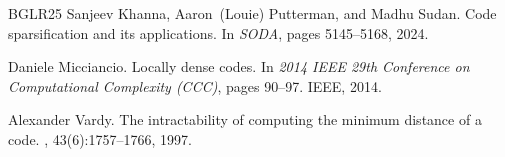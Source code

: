 \documentclass{article}
\begin{document}
\begin{thebibliography}{BGLR25}
Sanjeev Khanna, Aaron~(Louie) Putterman, and Madhu Sudan.
\newblock Code sparsification and its applications.
\newblock In {\em SODA}, pages 5145--5168, 2024.

Daniele Micciancio.
\newblock Locally dense codes.
\newblock In {\em 2014 IEEE 29th Conference on Computational Complexity (CCC)},
  pages 90--97. IEEE, 2014.

Alexander Vardy.
\newblock The intractability of computing the minimum distance of a code.
, 43(6):1757--1766,
  1997.

\end{thebibliography}
\end{document}
